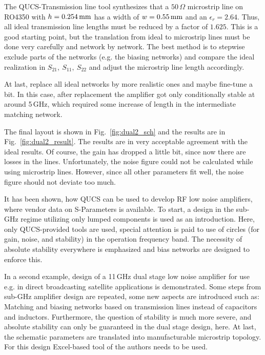 The QUCS-Transmission line tool synthesizes that a $50\,\Omega$
microstrip line on RO4350 with $h=0.254\,\mathrm{mm}$ has a width of
$w=0.55\,\mathrm{mm}$ and an $\epsilon_r=2.64$. Thus, all ideal
transmission line lengths must be reduced by a factor of $1.625$. This
is a good starting point, but the translation from ideal to microstrip
lines must be done very carefully and network by network. The best
method is to stepwise exclude parts of the networks (e.g. the biasing
networks) and compare the ideal realization in $S_{21},\ S_{11},\
S_{22}$ and adjust the microstrip line length accordingly.

At last, replace all ideal networks by more realistic ones and maybe
fine-tune a bit. In this case, after replacement the amplifier got
only conditionally stable at around 5\,GHz, which required some
increase of length in the intermediate matching network. 

The final layout is shown in Fig.~\ref{fig:dual2_sch} and the results
are in Fig.~\ref{fig:dual2_result}. The results are in very acceptable
agreement with the ideal results. Of course, the gain has dropped a
little bit, since now there are losses in the lines. Unfortunately,
the noise figure could not be calculated while using microstrip
lines. However, since all other parameters fit well, the noise figure
should not deviate too much.


It has been shown, how QUCS can be used to develop RF low noise
amplifiers, where vendor data on S-Parameters is available. To start,
a design in the sub-GHz regime utilizing only lumped components is
used as an introduction. Here, only QUCS-provided tools are used,
special attention is paid to use of circles (for gain, noise, and
stability) in the operation frequency band. The necessity of absolute
stability everywhere is emphasized and bias networks are designed to
enforce this. 

In a second example, design of a 11\,GHz  dual stage low noise amplifier for use
e.g. in direct broadcasting satellite applications is
demonstrated. Some steps from sub-GHz amplifier design are repeated,
some new aspects are introduced such as: Matching and biasing
networks based on transmission lines instead of capacitors and
inductors. Furthermore, the question of stability is much more severe,
and absolute stability can only be guaranteed in the dual stage
design, here. At last, the schematic parameters are translated into
manufacturable microstrip topology. For this design Excel-based tool
of the authors needs to be used. 

